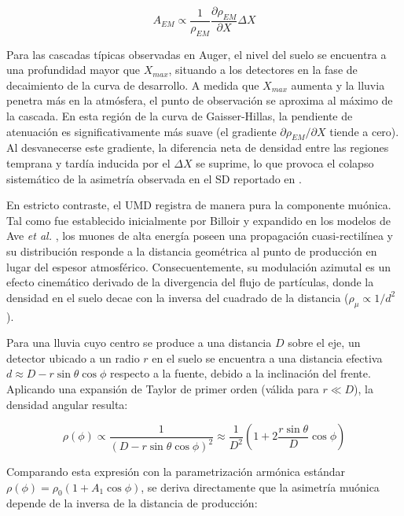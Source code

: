 \begin{equation}
	A_{EM} \propto \frac{1}{\rho_{EM}} \frac{\partial \rho_{EM}}{\partial X} \Delta X
	\label{eq:asym_em_taylor}
\end{equation}

Para las cascadas típicas observadas en Auger, el nivel del suelo se encuentra a una profundidad mayor que $X_{max}$, situando a los detectores en la fase de decaimiento de la curva de desarrollo. A medida que $X_{max}$ aumenta y la lluvia penetra más en la atmósfera, el punto de observación se aproxima al máximo de la cascada. En esta región de la curva de Gaisser-Hillas, la pendiente de atenuación es significativamente más suave (el gradiente $\partial \rho_{EM} / \partial X$ tiende a cero). Al desvanecerse este gradiente, la diferencia neta de densidad entre las regiones temprana y tardía inducida por el $\Delta X$ se suprime, lo que provoca el colapso sistemático de la asimetría observada en el SD reportado en \cite{BradfieldThesis}.

En estricto contraste, el UMD registra de manera pura la componente muónica. Tal como fue establecido inicialmente por Billoir \cite{GAP2000_017} y expandido en los modelos de Ave \textit{et al.} \cite{ave2017}, los muones de alta energía poseen una propagación cuasi-rectilínea y su distribución responde a la distancia geométrica al punto de producción en lugar del espesor atmosférico. Consecuentemente, su modulación azimutal es un efecto cinemático derivado de la divergencia del flujo de partículas, donde la densidad en el suelo decae con la inversa del cuadrado de la distancia ($\rho_\mu \propto 1/d^2$). 

Para una lluvia cuyo centro se produce a una distancia $D$ sobre el eje, un detector ubicado a un radio $r$ en el suelo se encuentra a una distancia efectiva $d \approx D - r \sin\theta \cos\phi$ respecto a la fuente, debido a la inclinación del frente. Aplicando una expansión de Taylor de primer orden (válida para $r \ll D$), la densidad angular resulta:

\begin{equation}
	\rho(\phi) \propto \frac{1}{(D - r \sin\theta \cos\phi)^2} \approx \frac{1}{D^2} \left( 1 + 2 \frac{r \sin\theta}{D} \cos\phi \right)
\end{equation}

Comparando esta expresión con la parametrización armónica estándar $\rho(\phi) = \rho_0 (1 + A_1 \cos\phi)$, se deriva directamente que la asimetría muónica depende de la inversa de la distancia de producción:

